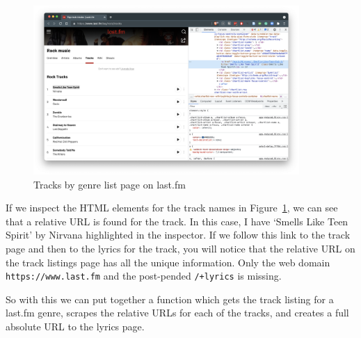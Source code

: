 \documentclass[
  letterpaper,
]{latex/krantz}
\begin{document}
\begin{figure}

{\centering \includegraphics[width=0.9\textwidth,height=\textheight]{./figures/acquire-data/ad-lastfm-genre-tracks-list.png}

}

\caption{\label{fig-ad-genre-tracks-list-lastfm}Tracks by genre list
page on last.fm}

\end{figure}

If we inspect the HTML elements for the track names in
Figure~\ref{fig-ad-genre-tracks-list-lastfm}, we can see that a relative
URL is found for the track. In this case, I have `Smells Like Teen
Spirit' by Nirvana highlighted in the inspector. If we follow this link
to the track page and then to the lyrics for the track, you will notice
that the relative URL on the track listings page has all the unique
information. Only the web domain \texttt{https://www.last.fm} and the
post-pended \texttt{/+lyrics} is missing.

So with this we can put together a function which gets the track listing
for a last.fm genre, scrapes the relative URLs for each of the tracks,
and creates a full absolute URL to the lyrics page.
\end{document}
